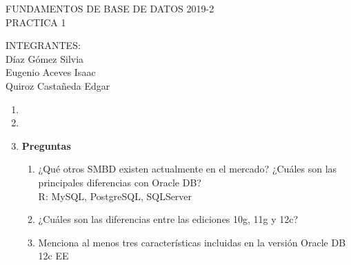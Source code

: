 \documentclass[10pt,onecolumn]{article}
\begin{document}

\begin{center}
{FUNDAMENTOS DE BASE DE DATOS 2019-2 \\PRACTICA 1}
\end{center}
\vspace{0.2cm}
\begin{center}
{\small{INTEGRANTES:\\Díaz Gómez Silvia\\ Eugenio Aceves Isaac \\ Quiroz Castañeda Edgar}}
\end{center}

\begin{enumerate}
	\item 
	\item 
	\item \bf{Preguntas}\\
	\begin{enumerate}
		\item ¿Qué otros SMBD existen actualmente en el mercado? ¿Cuáles son las principales diferencias con Oracle DB?\\
		R: MySQL, PostgreSQL, SQLServer
        \item ¿Cuáles son las diferencias entre las ediciones 10g, 11g y 12c?\\
        \item Menciona al menos tres características incluidas en la versión Oracle DB 12c EE\\
	\end{enumerate}
\end{enumerate}

\vspace{1 cm}

{\bf }

\vspace{0.2cm}











 
\end{document}
